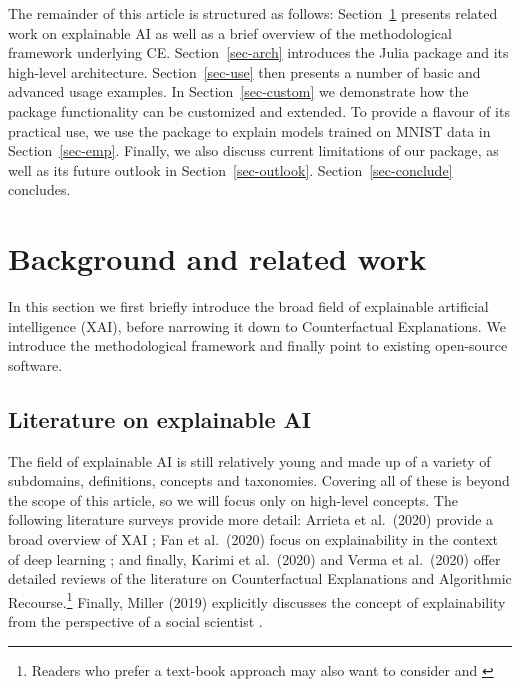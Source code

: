\documentclass{juliacon}
\begin{document}
The remainder of this article is structured as follows:
Section~\ref{sec-related} presents related work on explainable AI as
well as a brief overview of the methodological framework underlying CE.
Section~\ref{sec-arch} introduces the Julia package and its high-level
architecture. Section~\ref{sec-use} then presents a number of basic and
advanced usage examples. In Section~\ref{sec-custom} we demonstrate how
the package functionality can be customized and extended. To provide a
flavour of its practical use, we use the package to explain models
trained on MNIST data in Section~\ref{sec-emp}. Finally, we also discuss
current limitations of our package, as well as its future outlook in
Section~\ref{sec-outlook}. Section~\ref{sec-conclude} concludes.

\hypertarget{sec-related}{%
\section{Background and related work}\label{sec-related}}

In this section we first briefly introduce the broad field of
explainable artificial intelligence (XAI), before narrowing it down to
Counterfactual Explanations. We introduce the methodological framework
and finally point to existing open-source software.

\hypertarget{literature-on-explainable-ai}{%
\subsection{Literature on explainable
AI}\label{literature-on-explainable-ai}}

The field of explainable AI is still relatively young and made up of a
variety of subdomains, definitions, concepts and taxonomies. Covering
all of these is beyond the scope of this article, so we will focus only
on high-level concepts. The following literature surveys provide more
detail: Arrieta et al.~(2020) provide a broad overview of XAI
\cite{arrieta2020explainable}; Fan et al.~(2020) focus on explainability
in the context of deep learning \cite{fan2020interpretability}; and
finally, Karimi et al.~(2020) \cite{karimi2020survey} and Verma et
al.~(2020) \cite{verma2020counterfactual} offer detailed reviews of the
literature on Counterfactual Explanations and Algorithmic
Recourse.\footnote{Readers who prefer a text-book approach may also want
  to consider \cite{molnar2020interpretable} and
  \cite{varshney2022trustworthy}} Finally, Miller (2019) explicitly
discusses the concept of explainability from the perspective of a social
scientist \cite{miller2019explanation}.
\end{document}
